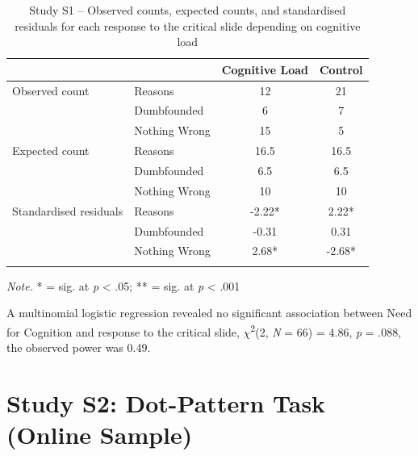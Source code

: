 \documentclass[
  american,
  man,floatsintext]{apa7}
\begin{document}
\begin{table}[tbp]

\begin{center}
\begin{threeparttable}

\caption{\label{tab:S1tab1dumb}Study S1 – Observed counts, expected counts, and standardised residuals for each response to the critical slide depending on cognitive load}

\begin{tabular}{llcc}
\toprule
 & \multicolumn{1}{c}{} & \multicolumn{1}{c}{Cognitive Load} & \multicolumn{1}{c}{Control}\\
\midrule
Observed count & Reasons & 12 & 21\\
 & Dumbfounded & 6 & 7\\
 & Nothing Wrong & 15 & 5\\
Expected count & Reasons & 16.5 & 16.5\\
 & Dumbfounded & 6.5 & 6.5\\
 & Nothing Wrong & 10 & 10\\
Standardised residuals & Reasons & -2.22* & 2.22*\\
 & Dumbfounded & -0.31 & 0.31\\
 & Nothing Wrong & 2.68* & -2.68*\\
\bottomrule
\addlinespace
\end{tabular}

\begin{tablenotes}[para]
\normalsize{\textit{Note.} * = sig. at \emph{p} < .05; ** = sig. at \emph{p} < .001}
\end{tablenotes}

\end{threeparttable}
\end{center}

\end{table}

A multinomial logistic regression revealed no significant association between Need for Cognition and response to the critical slide, \(\chi\)\textsuperscript{2}(2, \emph{N} = 66) = 4.86, \emph{p} = .088, the observed power was 0.49.

\newpage

\newpage

\hypertarget{study-s2-dot-pattern-task-online-sample}{%
\section{Study S2: Dot-Pattern Task (Online Sample)}\label{study-s2-dot-pattern-task-online-sample}}
\end{document}
